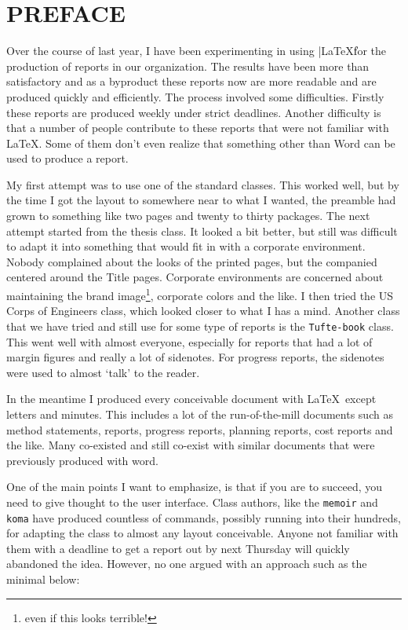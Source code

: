 \chapter{PREFACE}

Over the course of last year, I have been experimenting in using |\LaTeX\| for the production of reports in our
organization. The results have been more than satisfactory and as a byproduct these reports now are more
readable and are produced quickly and efficiently. The process involved some difficulties. Firstly these reports
are produced weekly under strict deadlines. Another difficulty is that a number of people contribute
to these reports that were not familiar with \LaTeX. Some of them don't even realize that something other
than Word can be used to produce a report.

My first attempt was to use one of the standard classes. This worked well, but by the time I got the layout to somewhere near to what I wanted, the preamble had grown to something like two pages and twenty to thirty packages. The next attempt started from the thesis class. It looked a bit better, but still was difficult to adapt it into something that would fit in with a  corporate environment. Nobody complained about the looks of the printed pages, but the companied centered around the Title pages. Corporate environments are concerned about maintaining the brand image\footnote{even if this looks terrible!}, corporate colors and the like. I then tried the US Corps of Engineers class, which looked closer to what I has a mind. Another class that we have tried and still use for some type of reports is the \texttt{Tufte-book} class. This went well with almost everyone, especially for reports that had a lot of margin figures and really a lot of sidenotes. For progress reports, the sidenotes were used to almost `talk' to the reader.

In the meantime I produced every conceivable document with \LaTeX\, except letters and minutes. This includes a lot of the run-of-the-mill documents such as method statements, reports, progress reports, planning reports, cost reports and the like. Many co-existed and still co-exist with similar documents that were previously produced with word.

One of the main points I want to emphasize, is that if you are to succeed, you need to give thought to the user interface. Class authors, like the \texttt{memoir} and \texttt{koma} have produced countless of commands, possibly running into their hundreds, for adapting the class to almost any layout conceivable. Anyone not familiar with them with a deadline to get a report out by next Thursday will quickly abandoned the idea. However, no one argued with an approach such as the minimal below:

